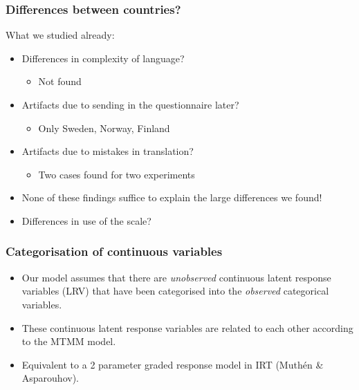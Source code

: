 \documentclass{beamer}
\begin{document}
\begin{frame}
\frametitle{Differences between countries?}

What we studied already:

\begin{itemize}[<alert@+>]
	\item Differences in complexity of language? 
		\begin{itemize}[<2-|alert@+>]\item{Not found}\end{itemize}
	\item Artifacts due to sending in the questionnaire later?
		\begin{itemize}[<4-|alert@+>]\item{Only Sweden, Norway, Finland}\end{itemize} 
	\item Artifacts due to mistakes in translation?
		\begin{itemize}[<6-|alert@+>]\item{Two cases found for two experiments}\end{itemize} 
	\item<7-|alert@+> None of these findings suffice to explain the large differences we found!
	\item<8-|alert@+> Differences in use of the scale?
\end{itemize}

\end{frame}

\begin{frame}
	\frametitle{Categorisation of continuous variables}

    \begin{itemize}
    \item Our model assumes that there are \emph{unobserved} continuous latent response variables (LRV) that have been categorised into the \emph{observed} categorical variables.
    \item These continuous latent response variables are related to each other according to the MTMM model.
    \item Equivalent to a 2 parameter graded response model in IRT (Muth\'en & Asparouhov).
    \end{itemize}
\end{frame}
\end{document}
